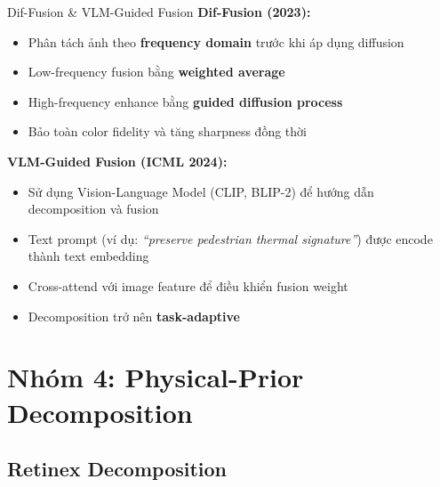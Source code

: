 \documentclass{beamer}
\begin{document}
\begin{frame}{Dif-Fusion \& VLM-Guided Fusion}
    \textbf{Dif-Fusion (2023):}
    \begin{itemize}
        \item Phân tách ảnh theo \textbf{frequency domain} trước khi áp dụng diffusion
        \item Low-frequency fusion bằng \textbf{weighted average}
        \item High-frequency enhance bằng \textbf{guided diffusion process}
        \item Bảo toàn color fidelity và tăng sharpness đồng thời
    \end{itemize}

    \vspace{0.3cm}
    \textbf{VLM-Guided Fusion (ICML 2024):}
    \begin{itemize}
        \item Sử dụng Vision-Language Model (CLIP, BLIP-2) để hướng dẫn decomposition và fusion
        \item Text prompt (ví dụ: \textit{``preserve pedestrian thermal signature''}) được encode thành text embedding
        \item Cross-attend với image feature để điều khiển fusion weight
        \item Decomposition trở nên \textbf{task-adaptive}
    \end{itemize}
\end{frame}

\section{Nhóm 4: Physical-Prior Decomposition}

\subsection{Retinex Decomposition}
\end{document}

